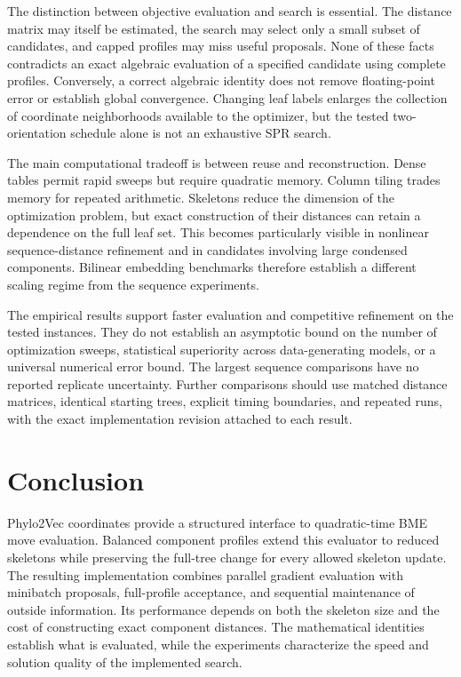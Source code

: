 \documentclass[11pt,a4paper]{article}
\makeatletter
\DeclareRobustCommand{\_}{\ifmmode\nfss@text{\textunderscore}\else\textunderscore\allowbreak\fi}
\theoremstyle{definition}
\makeatother
\begin{document}
The distinction between objective evaluation and search is essential.
The distance matrix may itself be estimated, the search may select only a small subset of candidates, and capped profiles may miss useful proposals.
None of these facts contradicts an exact algebraic evaluation of a specified candidate using complete profiles.
Conversely, a correct algebraic identity does not remove floating-point error or establish global convergence.
Changing leaf labels enlarges the collection of coordinate neighborhoods available to the optimizer, but the tested two-orientation schedule alone is not an exhaustive SPR search.

The main computational tradeoff is between reuse and reconstruction.
Dense tables permit rapid sweeps but require quadratic memory.
Column tiling trades memory for repeated arithmetic.
Skeletons reduce the dimension of the optimization problem, but exact construction of their distances can retain a dependence on the full leaf set.
This becomes particularly visible in nonlinear sequence-distance refinement and in candidates involving large condensed components.
Bilinear embedding benchmarks therefore establish a different scaling regime from the sequence experiments.

The empirical results support faster evaluation and competitive refinement on the tested instances.
They do not establish an asymptotic bound on the number of optimization sweeps, statistical superiority across data-generating models, or a universal numerical error bound.
The largest sequence comparisons have no reported replicate uncertainty.
Further comparisons should use matched distance matrices, identical starting trees, explicit timing boundaries, and repeated runs, with the exact implementation revision attached to each result.

\section{Conclusion}

Phylo2Vec coordinates provide a structured interface to quadratic-time BME move evaluation.
Balanced component profiles extend this evaluator to reduced skeletons while preserving the full-tree change for every allowed skeleton update.
The resulting implementation combines parallel gradient evaluation with minibatch proposals, full-profile acceptance, and sequential maintenance of outside information.
Its performance depends on both the skeleton size and the cost of constructing exact component distances.
The mathematical identities establish what is evaluated, while the experiments characterize the speed and solution quality of the implemented search.



\clearpage
\appendix

\end{document}

